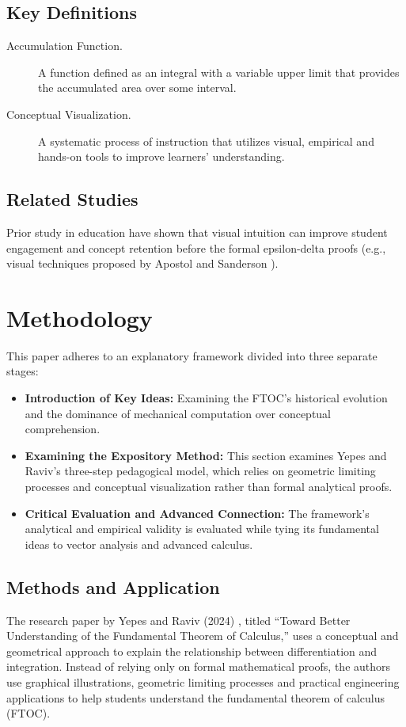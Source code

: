 \documentclass[11pt, a4paper]{article}
\begin{document}
\subsection{Key Definitions}
\label{subsec:definitions}
\begin{description}
    \item[Accumulation Function.] A function defined as an integral with a variable upper limit that provides the accumulated area over some interval.
    \item[Conceptual Visualization.] A systematic process of instruction that utilizes visual, empirical and hands-on tools to improve learners' understanding.
\end{description}

\subsection{Related Studies}
Prior study in education have shown that visual intuition can improve student engagement and concept retention before the formal epsilon-delta proofs (e.g., visual techniques proposed by Apostol \cite{Apostol2000} and Sanderson \cite{Sanderson2024}).

\section{Methodology}
\label{sec:methodology}
This paper adheres to an explanatory framework divided into three separate stages:
\begin{itemize}
    \item \textbf{Introduction of Key Ideas:} Examining the FTOC's historical evolution and the dominance of mechanical computation over conceptual comprehension.
    \item \textbf{Examining the Expository Method:} This section examines Yepes and Raviv's three-step pedagogical model, which relies on geometric limiting processes and conceptual visualization rather than formal analytical proofs.
    \item \textbf{Critical Evaluation and Advanced Connection:} The framework's analytical and empirical validity is evaluated while tying its fundamental ideas to vector analysis and advanced calculus.
\end{itemize}

\subsection{Methods and Application}
\label{subsec:methods}
The research paper by Yepes and Raviv (2024) \cite{Yepes2024}, titled ``Toward Better Understanding of the Fundamental Theorem of Calculus,'' uses a conceptual and geometrical approach to explain the relationship between differentiation and integration. Instead of relying only on formal mathematical proofs, the authors use graphical illustrations, geometric limiting processes and practical engineering applications to help students understand the fundamental theorem of calculus (FTOC).
\end{document}
